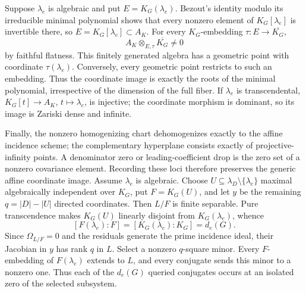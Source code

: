 Suppose \(\lambda_e\) is algebraic and put \(E=K_G(\lambda_e)\). Bezout's identity modulo its irreducible minimal polynomial shows that every nonzero element of \(K_G[\lambda_e]\) is invertible there, so \(E=K_G[\lambda_e]\subset A_K\). For every \(K_G\)-embedding \(\tau:E\to\overline{K_G}\),
\[
A_K\otimes_{E,\tau}\overline{K_G}\ne0
\]
by faithful flatness. This finitely generated algebra has a geometric point with coordinate \(\tau(\lambda_e)\). Conversely, every geometric point restricts to such an embedding. Thus the coordinate image is exactly the roots of the minimal polynomial, irrespective of the dimension of the full fiber. If \(\lambda_e\) is transcendental, \(K_G[t]\to A_K\), \(t\mapsto\lambda_e\), is injective; the coordinate morphism is dominant, so its image is Zariski dense and infinite.

Finally, the nonzero homogenizing chart dehomogenizes exactly to the affine incidence scheme; the complementary hyperplane consists exactly of projective-infinity points. A denominator zero or leading-coefficient drop is the zero set of a nonzero covariance element. Recording these loci therefore preserves the generic affine coordinate image.
Assume \(\lambda_e\) is algebraic. Choose \(U\subseteq\lambda_D\setminus\{\lambda_e\}\) maximal algebraically independent over \(K_G\), put \(F=K_G(U)\), and let \(y\) be the remaining \(q=|D|-|U|\) directed coordinates. Then \(L/F\) is finite separable. Pure transcendence makes \(K_G(U)\) linearly disjoint from \(K_G(\lambda_e)\), whence
\[
[F(\lambda_e):F]=[K_G(\lambda_e):K_G]=d_e(G).
\]
Since \(\Omega_{L/F}=0\) and the residuals generate the prime incidence ideal, their Jacobian in \(y\) has rank \(q\) in \(L\). Select a nonzero \(q\)-square minor. Every \(F\)-embedding of \(F(\lambda_e)\) extends to \(L\), and every conjugate sends this minor to a nonzero one. Thus each of the \(d_e(G)\) queried conjugates occurs at an isolated zero of the selected subsystem.

